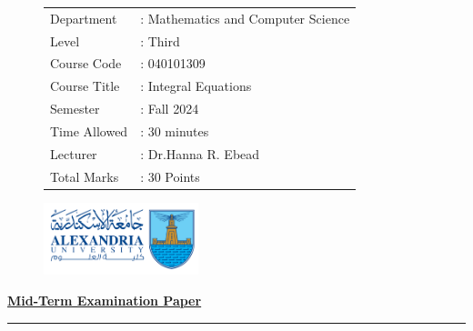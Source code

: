\documentclass[]{article}
\begin{document}
\thispagestyle{empty}
\begin{figure}
    \begin{minipage}{0.7\textwidth}
            \begin{tabular}{l l}
                Department &: Mathematics and Computer Science \\
                Level &: Third \\
                Course Code &: 040101309                      \\
                Course Title &:  Integral Equations            \\
                Semester &: Fall 2024                        \\
                Time Allowed &: 30 minutes                    \\
                Lecturer &: Dr.Hanna R. Ebead                  \\
                Total Marks &: 30 Points                          \\
            \end{tabular}
    \end{minipage}%
    \begin{minipage}{0.3\textwidth}
        \includegraphics[width=4.5cm]{collagelogo.png}
    \end{minipage}
\end{figure}
\vspace*{-1cm}
\begin{center}
    \textbf{\underline{\LARGE Mid-Term Examination Paper}}
\end{center}
\vspace*{.2cm}

\hrule
\end{document}
